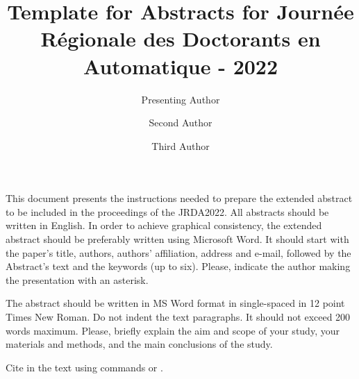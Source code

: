 \documentclass[JRDA]{JRDA}
\title{Template for Abstracts for Journée Régionale des Doctorants en Automatique - 2022}
\author[*1]{Presenting Author}
\author[1,2]{Second Author}
\author[2]{Third Author}
\affil[1]{Department name, Institution 1}
\affil[2]{Department name, Instituion 2}
\begin{document}
\maketitle

This document presents the instructions needed to prepare the extended abstract to be included in the proceedings of the JRDA2022. All abstracts should be written in English. In order to achieve graphical consistency, the extended abstract should be preferably written using Microsoft Word. It should start with the paper’s title, authors, authors’ affiliation, address and e-mail, followed by the Abstract's text and the keywords (up to six). Please, indicate the author making the presentation with an asterisk. 

The abstract should be written in MS Word format in single-spaced in 12 point Times New Roman. Do not indent the text paragraphs. It should not exceed 200 words maximum. Please, briefly explain the aim and scope of your study, your materials and methods, and the main conclusions of the study.

 Cite in the text using commands \citep{gargett1984,lilly1983} or \cite{thorpe2005}. 



\end{document}
